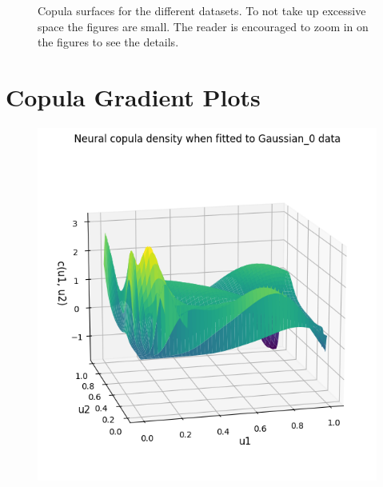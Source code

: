 \documentclass[%
a4paper,							
11pt,								
bibliography=totoc,						
abstracton=true					
]
{scrartcl}
\theoremstyle{plain}
\theoremstyle{definition}
\theoremstyle{remark}
\newcommand{\1}{\mathbbm{1}}
\begin{document}
\begin{figure}[H]
    \caption{Copula surfaces for the different datasets. To not take up excessive space the figures are small. The reader is encouraged to zoom in on the figures to see the details.}
    \label{fig:NeuralCopulaSurface}
\end{figure}



\newpage
\section{Copula Gradient Plots}\label{sec:CopulaGradientsPlots}
\begin{figure}[H]
    \centering
    \begin{minipage}{0.49\textwidth}
        \centering
        \includegraphics[width=\textwidth]{5ResultsDiscussion/pictures/PortfolioTest/GradPort1.png}
    \end{minipage}
    \hfill
    \begin{minipage}{0.49\textwidth}
        \centering

\end{minipage}
\end{figure}
\end{document}

